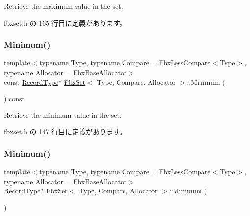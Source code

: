 Retrieve the maximum value in the set. 



 fbxset.\+h の 165 行目に定義があります。

\mbox{\label{class_fbx_set_a11cee93b66335569aa45fbcd886ae9ff}} 
\subsubsection{\texorpdfstring{Minimum()}{Minimum()}\hspace{0.1cm}{\footnotesize\ttfamily [1/2]}}
{\footnotesize\ttfamily template$<$typename Type, typename Compare = Fbx\+Less\+Compare$<$\+Type$>$, typename Allocator = Fbx\+Base\+Allocator$>$ \\
const \hyperlink{class_fbx_set_aa3934cd434a09288204f5e6c99b9cd01}{Record\+Type}$\ast$ \hyperlink{class_fbx_set}{Fbx\+Set}$<$ Type, Compare, Allocator $>$\+::Minimum (\begin{DoxyParamCaption}{ }\end{DoxyParamCaption}) const\hspace{0.3cm}{\ttfamily [inline]}}



Retrieve the minimum value in the set. 



 fbxset.\+h の 147 行目に定義があります。

\mbox{\label{class_fbx_set_a26fc1b8f0649dc4e12ad440169260df7}} 
\subsubsection{\texorpdfstring{Minimum()}{Minimum()}\hspace{0.1cm}{\footnotesize\ttfamily [2/2]}}
{\footnotesize\ttfamily template$<$typename Type, typename Compare = Fbx\+Less\+Compare$<$\+Type$>$, typename Allocator = Fbx\+Base\+Allocator$>$ \\
\hyperlink{class_fbx_set_aa3934cd434a09288204f5e6c99b9cd01}{Record\+Type}$\ast$ \hyperlink{class_fbx_set}{Fbx\+Set}$<$ Type, Compare, Allocator $>$\+::Minimum (\begin{DoxyParamCaption}{ }\end{DoxyParamCaption})\hspace{0.3cm}{\ttfamily [inline]}}



